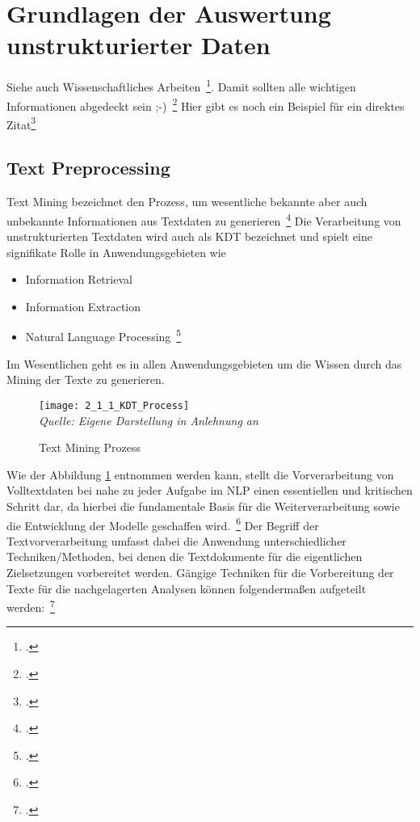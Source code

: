 \newpage
\section{Grundlagen der Auswertung unstrukturierter Daten} \label{infos}
Siehe auch Wissenschaftliches Arbeiten~\footcite[\vglf][S. 1]{savic.2020}. %
Damit sollten alle wichtigen Informationen abgedeckt sein ;-)~\footcite[\vglf][]{savic.2020} %
Hier gibt es noch ein Beispiel für ein direktes Zitat\footcite[][]{savic.2020} %

\subsection{Text Preprocessing}
Text Mining bezeichnet den Prozess, um wesentliche bekannte aber auch unbekannte Informationen aus Textdaten zu
generieren~\footcite[\vglf][]{mohan.2015}
Die Verarbeitung von unstrukturierten Textdaten wird auch als \ac{KDT}
bezeichnet und spielt eine signifikate Rolle in Anwendungsgebieten wie

\begin{itemize}
    \item Information Retrieval
    \item Information Extraction
    \item Natural Language Processing~\footcite[\vglf][ f.]{mohan.2015}
\end{itemize}
Im Wesentlichen geht es in allen \og Anwendungsgebieten um die Wissen durch das Mining der Texte zu generieren.

\begin{figure}[H]
    \caption{Text Mining Prozess}\label{fig:2_1_1_KDT_Process}
    \texttt{[image: 2\_1\_1\_KDT\_Process]}
    \\
    \textit{Quelle: Eigene Darstellung in Anlehnung an}~\cite[]{mohan.2015}
\end{figure}

Wie der Abbildung \ref{fig:2_1_1_KDT_Process} entnommen werden kann, stellt die Vorverarbeitung von Volltextdaten bei nahe
zu jeder Aufgabe im \ac{NLP} einen essentiellen und kritischen Schritt dar,
da hierbei die fundamentale Basis für die Weiterverarbeitung
sowie die Entwicklung der Modelle geschaffen wird.~\footcite[\vglf][]{gurusamy.2014}
Der Begriff der Textvorverarbeitung umfasst dabei die Anwendung unterschiedlicher Techniken/Methoden, bei
denen die Textdokumente für die eigentlichen Zielsetzungen vorbereitet werden.
Gängige Techniken für die Vorbereitung der Texte für die nachgelagerten Analysen können folgendermaßen aufgeteilt
werden:~\footcite[\vglf][]{pahwa.2018}

